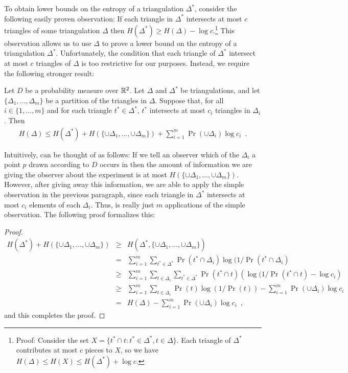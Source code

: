 \documentclass[acmtalg]{acmsmall}
\begin{document}
To obtain lower bounds on the entropy of a triangulation $\Delta^*$,
consider the following easily proven observation: If each triangle in
$\Delta^*$ intersects at most $c$ triangles of some triangulation
$\Delta$ then $H(\Delta^*) \ge H(\Delta) - \log c$.\footnote{Proof:
Consider the set $X=\{ t^*\cap t : t^*\in\Delta^*, t\in \Delta\}$.
Each triangle of $\Delta^*$ contributes at most $c$ pieces to $X$, so
we have $H(\Delta) \le H(X) \le H(\Delta^*) + \log c$.}  This
observation allows us to use $\Delta$ to prove a lower bound on the
entropy of a triangulation $\Delta^*$.  Unfortunately, the condition
that each triangle of $\Delta^*$ intersect at most $c$ triangles of
$\Delta$ is too restrictive for our purposes.  Instead, we require
the following stronger result:

\begin{lem}
Let $D$ be a probability measure over $\mathbb{R}^2$.  Let $\Delta$ and
$\Delta^*$ be triangulations, and let $\{\Delta_1,\ldots,\Delta_m\}$
be a partition of the triangles in $\Delta$.  Suppose that, for all
$i\in\{1,\ldots,m\}$ and for each triangle $t^*\in\Delta^*$, $t^*$
intersects at most $c_i$ triangles in $\Delta_i$.  Then
\begin{eqnarray*}
   H(\Delta) \le 
	 H(\Delta^*) + H(\{\cup\Delta_1,\ldots,\cup\Delta_m\}) + 
	\sum_{i=1}^m \Pr(\cup\Delta_i)\log c_i
 \enspace . 
\end{eqnarray*}
\end{lem}

Intuitively,  can be thought of as follows:  If we tell
an observer which of the $\Delta_i$ a point $p$ drawn according to $D$
occurs in then the amount of information we are giving the observer
about the experiment is at most
$H(\{\cup\Delta_1,\ldots,\cup\Delta_m\})$.  However, after giving away
this information, we are able to apply the simple observation in the
previous paragraph, since each triangle in $\Delta^*$ intersects at
most $c_i$ elements of each $\Delta_i$.  Thus,  is
really just $m$ applications of the simple observation.  The following
proof formalizes this:

\begin{proof}
\begin{eqnarray*}
   H(\Delta^*)  +H(\{\cup\Delta_1,\ldots,\cup\Delta_m\})
     & \ge & H(\Delta^*,\{\cup\Delta_1,\ldots,\cup\Delta_m\}) \\
     &  =  & \sum_{i=1}^m
              \sum_{t^*\in\Delta^*}
               \Pr(t^*\cap\Delta_i)\log (1/\Pr(t^*\cap\Delta_i) \\
     & \ge & \sum_{i=1}^m
              \sum_{t\in\Delta_i}
               \sum_{t^*\in\Delta^*}
                  \Pr(t^*\cap t)
                    \left(\log (1/\Pr(t^*\cap t) - \log c_i \right) \\
     & \ge  & \sum_{i=1}^m 
               \sum_{t\in\Delta_i}
                \Pr(t)\log(1/\Pr(t)) 
                -\sum_{i=1}^m \Pr(\cup\Delta_i)\log c_i  \\
     &  =  & H(\Delta) -\sum_{i=1}^m \Pr(\cup\Delta_i)\log c_i
            \enspace ,
\end{eqnarray*}
and this completes the proof.
\end{proof}
\end{document}
